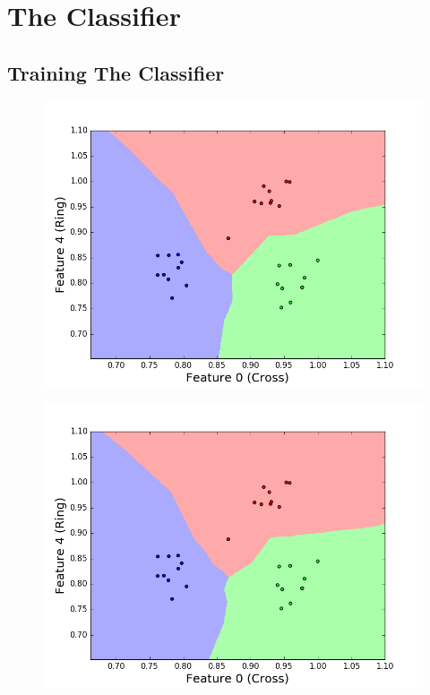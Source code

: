 \documentclass[11pt, a4paper]{article}
\begin{document}
\section{The Classifier}
\subsection{Training The Classifier}

\begin{figure}[!h]
\begin{minipage}[b]{.5\textwidth}
\centering
\includegraphics[width=1\textwidth]{training_plot_k1.png}
\label{fig:traina}
\end{minipage}%
\begin{minipage}[b]{.5\textwidth}
\centering
\includegraphics[width=1\textwidth]{training_plot_k2.png}

\end{minipage}
\end{figure}
\end{document}
